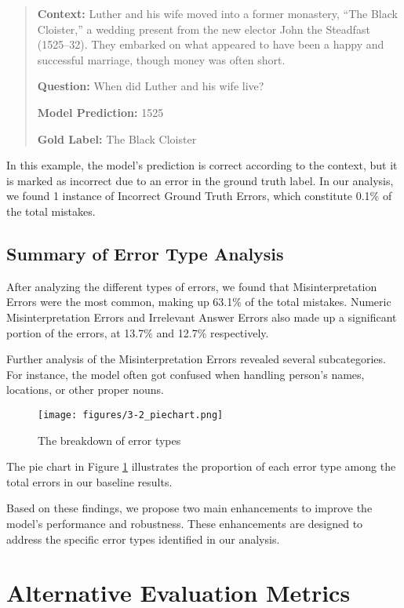 \documentclass{article}
\begin{document}
\begin{quote}
\textbf{Context:} Luther and his wife moved into a former monastery, ``The
Black Cloister,'' a wedding present from the new elector John the Steadfast
(1525–32). They embarked on what appeared to have been a happy and successful
marriage, though money was often short.

\textbf{Question:} When did Luther and his wife live?

\textbf{Model Prediction:} 1525

\textbf{Gold Label:} The Black Cloister
\end{quote}

In this example, the model's prediction is correct according to the context,
but it is marked as incorrect due to an error in the ground truth label.
In our analysis, we found 1 instance of
Incorrect Ground Truth Errors, which constitute 0.1\% of the total mistakes.

\subsection{Summary of Error Type Analysis}

After analyzing the different types of errors, we found that Misinterpretation
Errors were the most common, making up 63.1\% of the total mistakes. Numeric
Misinterpretation Errors and Irrelevant Answer Errors also made up a significant
portion of the errors, at 13.7\% and 12.7\% respectively.

Further analysis of the Misinterpretation Errors revealed several subcategories.
For instance, the model often got confused when handling person's names,
locations, or other proper nouns.

\begin{figure}[ht]
  \centering
  \texttt{[image: figures/3-2\_piechart.png]}
  \caption{The breakdown of error types}
  \label{fig:pie_chart}
\end{figure}

The pie chart in Figure \ref{fig:pie_chart} illustrates the proportion of each
error type among the total errors in our baseline results.

Based on these findings, we propose two main enhancements to improve
the model's performance and robustness. These enhancements are designed
to address the specific error types identified in our analysis.

\section{Alternative Evaluation Metrics}
\end{document}
